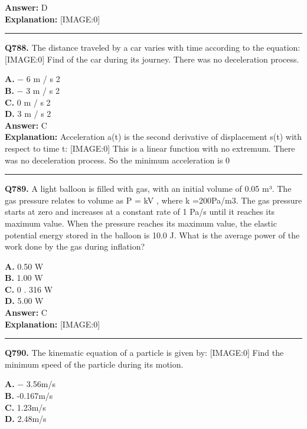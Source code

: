 \documentclass[12pt]{article}
\begin{document}
\textbf{Answer:} D \\
\textbf{Explanation:} [IMAGE:0]

\hrule
\vspace{1em}


\noindent
\textbf{Q788.} The distance traveled by a car varies with time according to the equation:
[IMAGE:0]
Find of the car during its journey.
There was no deceleration process.



\textbf{A.} −
6
m
/
s
2 \\
\textbf{B.} −
3
m
/
s
2 \\
\textbf{C.} 0
m
/
s
2 \\
\textbf{D.} 3
m
/
s
2 \\

\textbf{Answer:} C \\
\textbf{Explanation:} Acceleration a(t) is the second derivative of displacement s(t) with respect to time t:
[IMAGE:0]
This is a linear function with no extremum. There was no deceleration process.
So the minimum acceleration is 0

\hrule
\vspace{1em}


\noindent
\textbf{Q789.} A light balloon is filled with gas, with an initial volume of 0.05 m³. The gas pressure relates to volume as
P
=
kV
, where
k
=200Pa/m3. The gas pressure starts at zero and increases at a constant rate of
1
Pa/s until it reaches its maximum value. When the pressure reaches its maximum value, the elastic potential energy stored in the balloon is 10.0 J. What is the average power of the work done by the gas during inflation?



\textbf{A.} 0.50 W \\
\textbf{B.} 1.00 W \\
\textbf{C.} 0
.
316
W \\
\textbf{D.} 5.00 W \\

\textbf{Answer:} C \\
\textbf{Explanation:} [IMAGE:0]

\hrule
\vspace{1em}


\noindent
\textbf{Q790.} The kinematic equation of a particle is given by:
[IMAGE:0]
Find the minimum speed of the particle during its motion.



\textbf{A.} −
3.56m/s \\
\textbf{B.} -0.167m/s \\
\textbf{C.} 1.23m/s \\
\textbf{D.} 2.48m/s \\
\end{document}
